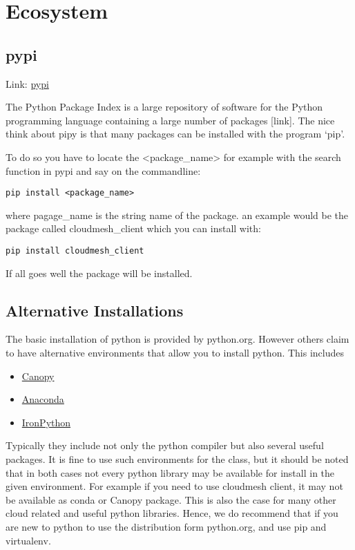 \section{Ecosystem}\label{ecosystem}

\subsection{pypi}\label{pypi}

Link: \href{https://pypi.python.org/pypi}{pypi}

The Python Package Index is a large repository of software for the
Python programming language containing a large number of packages
{[}link{]}. The nice think about pipy is that many packages can be
installed with the program `pip'.

To do so you have to locate the \textless{}package\_name\textgreater{}
for example with the search function in pypi and say on the commandline:

\begin{verbatim}
pip install <package_name>
\end{verbatim}

where pagage\_name is the string name of the package. an example would
be the package called cloudmesh\_client which you can install with:

\begin{verbatim}
pip install cloudmesh_client
\end{verbatim}

If all goes well the package will be installed.

\subsection{Alternative Installations}\label{alternative-installations}

The basic installation of python is provided by python.org. However
others claim to have alternative environments that allow you to install
python. This includes

\begin{itemize}
\tightlist
\item
  \href{https://store.enthought.com/downloads/\#default}{Canopy}
\item
  \href{https://www.continuum.io/downloads}{Anaconda}
\item
  \href{http://ironpython.net/}{IronPython}
\end{itemize}

Typically they include not only the python compiler but also several
useful packages. It is fine to use such environments for the class, but
it should be noted that in both cases not every python library may be
available for install in the given environment. For example if you need
to use cloudmesh client, it may not be available as conda or Canopy
package. This is also the case for many other cloud related and useful
python libraries. Hence, we do recommend that if you are new to python
to use the distribution form python.org, and use pip and virtualenv.

